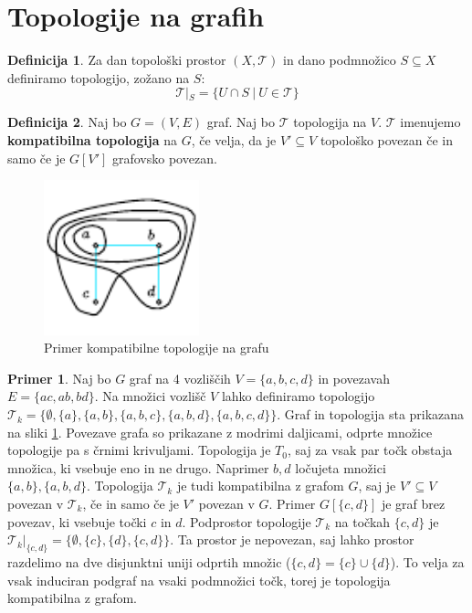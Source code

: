 \documentclass[a4paper, 12pt]{book}
\theoremstyle{definition}
\newtheorem{definition}{Definicija}[section]
\newtheorem{example}{Primer}[section]
\theoremstyle{remark}
\begin{document}
\section{Topologije na grafih}
\begin{definition}
  Za dan topološki prostor $(X, \mathcal{T})$ in dano podmnožico $S \subseteq X$ definiramo
  topologijo, zožano na $S$: \[\mathcal{T}|_S = \{U \cap S\ |\ U \in \mathcal{T}\}\]
\end{definition}
\begin{definition}
  Naj bo $G = (V,E)$ graf. Naj bo $\mathcal{T}$ topologija na $V$. $\mathcal{T}$ imenujemo \textbf{kompatibilna
  topologija} na $G$, če velja, da je
  $V' \subseteq V$ topološko povezan če in samo če je $G[V']$ grafovsko povezan.
\end{definition}
\newpage
\begin{figure}[h]
  \begin{center}
  \includegraphics[width=0.4\textwidth]{compatible-topology.pdf}
  \end{center}
  \caption{Primer kompatibilne topologije na grafu}
  \label{compat-topol}
\end{figure}
\begin{example}
  Naj bo $G$ graf na 4 vozliščih $V=\{a,b,c,d\}$ in povezavah $E=\{ac,ab,bd\}$. Na množici
  vozlišč $V$ lahko definiramo topologijo $\mathcal{T}_k = \{\emptyset, \{a\}, \{a, b\}, \{a, b, c\}, \{a, b, d\}, \{a, b, c, d\}\}$.
  Graf in topologija sta prikazana na sliki \ref{compat-topol}. Povezave grafa so prikazane z modrimi daljicami,
  odprte množice topologije pa s črnimi krivuljami. Topologija je $T_0$, saj za vsak par točk
  obstaja množica, ki vsebuje eno in ne drugo. Naprimer $b,d$ ločujeta množici $\{a, b\}, \{a, b, d\}$.
  Topologija $\mathcal{T}_k$ je tudi kompatibilna z grafom $G$, saj je $V' \subseteq V$ povezan v $\mathcal{T}_k$,
  če in samo če je $V'$ povezan v $G$. Primer $G[\{c,d\}]$ je graf brez povezav, ki vsebuje točki $c$ in $d$. Podprostor
  topologije $\mathcal{T}_k$ na točkah $\{c,d\}$ je $\mathcal{T}_k|_{\{c,d\}} = \{\emptyset, \{c\}, \{d\}, \{c, d\}\}$.
  Ta prostor je nepovezan, saj lahko prostor razdelimo na dve disjunktni uniji odprtih množic ($\{c, d\} = \{c\} \cup \{d\}$).
  To velja za vsak induciran podgraf na vsaki podmnožici točk, torej je topologija kompatibilna z grafom.
\end{example}
\end{document}
